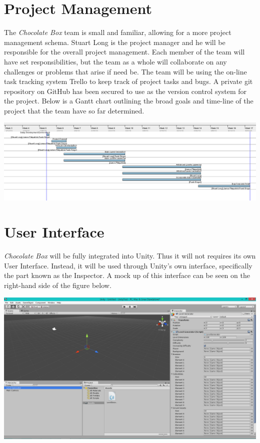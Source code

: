 \documentclass[pdftex,12pt,letter]{article}
\begin{document}
\section{Project Management}
The \textit{Chocolate Box} team is small and familiar, allowing for a more project management schema. Stuart Long is the project manager and he will be responsible for the overall project management. Each member of the team will have set responsibilities, but the team as a whole will collaborate on any challenges or problems that arise if need be. The team will be using the on-line task tracking system Trello to keep track of project tasks and bugs. A private git repository on GitHub has been secured to use as the version control system for the project. Below is a Gantt chart outlining the broad goals and time-line of the project that the team have so far determined.
\centerline{\includegraphics[width=7in]{GanttSS.png}}
\FloatBarrier
\section{User Interface}
\textit{Chocolate Box} will be fully integrated into Unity. Thus it will not requires its own User Interface. Instead, it will be used through Unity's own interface, specifically the part known as the Inspector. A mock up of this interface can be seen on the right-hand side of the figure below.

\centerline{\includegraphics[width=7in]{UnitySS.png}}
\FloatBarrier
\end{document}
